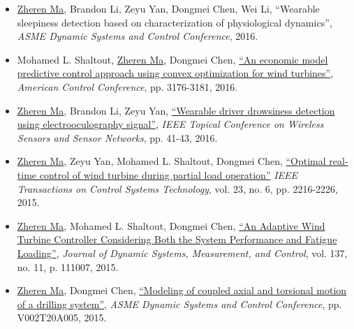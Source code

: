 \documentclass[margin, 9pt]{res} %
\begin{document}
\begin{resume}
\begin{itemize}[leftmargin=*]
    \item \underline{Zheren Ma}, Brandon Li, Zeyu Yan, Dongmei Chen, Wei Li,
        {``Wearable sleepiness detection based on characterization of physiological dynamics''},
       \textit{ASME Dynamic Systems and Control Conference}, 2016.
       
        \item Mohamed L. Shaltout, \underline{Zheren Ma}, Dongmei Chen,
         \href{http://ieeexplore.ieee.org/xpl/login.jsp?tp=&arnumber=7525406&url=http\%3A\%2F\%2Fieeexplore.ieee.org\%2Fxpls\%2Fabs_all.jsp\%3Farnumber\%3D7525406}
          {``An economic model predictive control approach using convex optimization for wind turbines''},
          \textit{American Control Conference}, pp. 3176-3181, 2016.
             
    \item \underline{Zheren Ma}, Brandon Li, Zeyu Yan,
         \href{http://ieeexplore.ieee.org/xpl/login.jsp?tp=&arnumber=7444317&url=http\%3A\%2F\%2Fieeexplore.ieee.org\%2Fxpls\%2Fabs_all.jsp\%3Farnumber\%3D7444317}
          {``Wearable driver drowsiness detection using electrooculography signal''},
          \textit{IEEE Topical Conference on Wireless Sensors and Sensor Networks}, pp. 41-43, 2016.
          
	\item \underline{Zheren Ma}, Zeyu Yan, Mohamed L. Shaltout, Dongmei Chen,
          \href{http://ieeexplore.ieee.org/xpl/login.jsp?tp=&arnumber=7065260&url=http\%3A\%2F\%2Fieeexplore.ieee.org\%2Fxpls\%2Fabs_all.jsp\%3Farnumber\%3D7065260}
          {``Optimal real-time control of wind turbine during partial load operation''}
          \textit{IEEE Transactions on Control Systems Technology}, vol. 23, no. 6, pp. 2216-2226, 2015.

   \item \underline{Zheren Ma}, Mohamed L. Shaltout, Dongmei Chen,
          \href{http://dynamicsystems.asmedigitalcollection.asme.org/article.aspx?articleid=2468735}
          {``An Adaptive Wind Turbine Controller Considering Both the System Performance and Fatigue Loading''},
          \textit{Journal of Dynamic Systems, Measurement, and Control}, vol. 137, no. 11, p. 111007, 2015.
          
	\item \underline{Zheren Ma}, Dongmei Chen,
          \href{http://proceedings.asmedigitalcollection.asme.org/proceeding.aspx?articleid=2481922}{``Modeling of coupled axial and torsional motion of a drilling system''},
          \textit{ASME Dynamic Systems and Control Conference}, pp. V002T20A005, 2015.


\end{itemize}
\end{resume}
\end{document}
